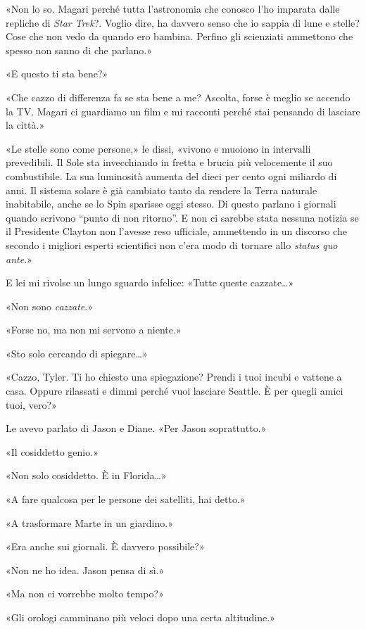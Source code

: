 «Non lo so. Magari perché tutta l'astronomia che conosco l'ho imparata
dalle repliche di \emph{Star Trek}?. Voglio dire, ha davvero senso che
io sappia di lune e stelle? Cose che non vedo da quando ero bambina.
Perfino gli scienziati ammettono che spesso non sanno di che parlano.»

«E questo ti sta bene?»

«Che cazzo di differenza fa se sta bene a me? Ascolta, forse è meglio se
accendo la TV. Magari ci guardiamo un film e mi racconti perché stai
pensando di lasciare la città.»

«Le stelle sono come persone,» le dissi, «vivono e muoiono in intervalli
prevedibili. Il Sole sta invecchiando in fretta e brucia più velocemente
il suo combustibile. La sua luminosità aumenta del dieci per cento ogni
miliardo di anni. Il sistema solare è già cambiato tanto da rendere la
Terra naturale inabitabile, anche se lo Spin sparisse oggi stesso. Di
questo parlano i giornali quando scrivono ``punto di non ritorno''. E
non ci sarebbe stata nessuna notizia se il Presidente Clayton non
l'avesse reso ufficiale, ammettendo in un discorso che secondo i
migliori esperti scientifici non c'era modo di tornare allo \emph{status
	quo ante}.»

E lei mi rivolse un lungo sguardo infelice: «Tutte queste cazzate\ldots»

«Non sono \emph{cazzate}.»

«Forse no, ma non mi servono a niente.»

«Sto solo cercando di spiegare\ldots»

«Cazzo, Tyler. Ti ho chiesto una spiegazione? Prendi i tuoi incubi e
vattene a casa. Oppure rilassati e dimmi perché vuoi lasciare Seattle. È
per quegli amici tuoi, vero?»

Le avevo parlato di Jason e Diane. «Per Jason soprattutto.»

«Il cosiddetto genio.»

«Non solo cosiddetto. È in Florida\ldots»

«A fare qualcosa per le persone dei satelliti, hai detto.»

«A trasformare Marte in un giardino.»

«Era anche sui giornali. È davvero possibile?»

«Non ne ho idea. Jason pensa di sì.»

«Ma non ci vorrebbe molto tempo?»

«Gli orologi camminano più veloci dopo una certa altitudine.»

